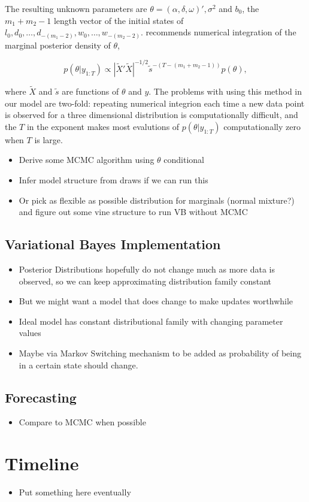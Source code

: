 \documentclass{article}\usepackage[]{graphicx}\usepackage[]{color}
\begin{document}
The resulting unknown parameters are $\theta = (\alpha, \delta, \omega)', \sigma^2$ and $b_0$, the $m_1 + m_2 - 1$ length vector of the initial states of $l_0, d_0, \dots, d_{-(m_1 - 2)}, w_0, \dots, w_{-(m_2 - 2)}$.
\citet{Forbes2000} recommends numerical integration of the marginal posterior density of $\theta$,

\begin{equation}
\label{exp-sm-marginal}
p(\theta | y_{1:T}) \propto \left| \widetilde{X}' \widetilde{X} \right|^{-1/2} \tilde{s}^{-(T-(m_1 + m_2 - 1))} p(\theta),
\end{equation}

where $\widetilde{X}$ and $\tilde{s}$ are functions of $\theta$ and $y$. The problems with using this method in our model are two-fold: repeating numerical integrion each time a new data point is observed for a three dimensional distribution is computationally difficult, and the $T$ in the exponent makes most evalutions of $p(\theta | y_{1:T})$ computationally zero when $T$ is large.

\begin{itemize}
\item Derive some MCMC algorithm using $\theta$ conditional
\item Infer model structure from draws if we can run this
\item Or pick as flexible as possible distribution for marginals (normal mixture?) and figure out some vine structure to run VB without MCMC
\end{itemize}

\subsection{Variational Bayes Implementation}
\begin{itemize}
\item Posterior Distributions hopefully do not change much as more data is observed, so we can keep approximating distribution family constant
\item But we might want a model that does change to make updates worthwhile
\item Ideal model has constant distributional family with changing parameter values
\item Maybe via Markov Switching mechanism to be added as probability of being in a certain state should change.
\end{itemize}
\subsection{Forecasting}

\begin{itemize}
\item Compare to MCMC when possible
\end{itemize}

\section{Timeline}
\begin{itemize}
\item Put something here eventually
\end{itemize}



\end{document}
